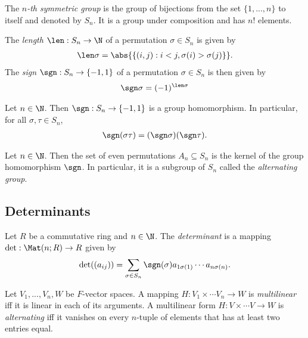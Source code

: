 \documentclass{article}
\begin{document}
\begin{definition}
	The \emph{$n$-th symmetric group} is the group of bijections from the set $\{1,...,n\}$ to itself
	and denoted by $S_n$. It is a group under composition and has $n!$ elements.
\end{definition}

\begin{definition}
	The \emph{length} $\len:S_n\to\N$ of a permutation $\sigma\in S_n$ is given by
	\begin{align*}
		\len \sigma = \abs{\{(i,j):i<j,\sigma(i)>\sigma(j)\}}.
	\end{align*}
	The \emph{sign} $\sgn:S_n\to\{-1,1\}$ of a permutation $\sigma\in S_n$ is then
	given by
	\begin{align*}
		\sgn \sigma = (-1)^{\len \sigma}
	\end{align*}
\end{definition}

\begin{lemma}[Lemma 4.1.5]
	Let $n\in\N$. Then $\sgn:S_n\to\{-1,1\}$ is a group homomorphism. In particular, for all $\sigma,\tau\in S_n$,
	\begin{align*}
		\sgn(\sigma\tau) = (\sgn\sigma)(\sgn\tau).
	\end{align*}
\end{lemma}

\begin{definition}
	Let $n\in\N$. Then the set of even permutations $A_n\subseteq S_n$ is the kernel of the
	group homomorphism $\sgn$. In particular, it is a subgroup of $S_n$ called the \emph{alternating
		group}.
\end{definition}

\subsection{Determinants}

\begin{definition}
	Let $R$ be a commutative ring and $n\in\N$. The \emph{determinant} is a mapping
	$\det:\Mat(n;R)\to R$ given by
	\begin{align*}
		\det((a_{ij}))=\sum_{\sigma\in S_n}\sgn(\sigma)a_{1\sigma(1)}\cdots a_{n\sigma(n)}.
	\end{align*}
\end{definition}

\begin{definition}
	Let $V_1,...,V_n,W$ be $F$-vector spaces. A mapping $H:V_1\times\cdots V_n\to W$
	is \emph{multilinear} iff it is linear in each of its arguments. A multilinear form
	$H:V\times \cdots V\to W$ is \emph{alternating} iff it vanishes on every $n$-tuple of
	elements that has at least two entries equal.
\end{definition}
\end{document}

